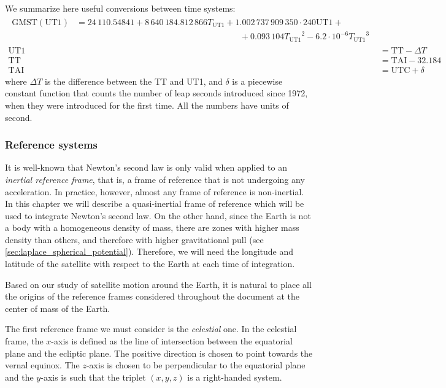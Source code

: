 \documentclass[../main.tex]{subfiles}
\begin{document}
We summarize here useful conversions between time systems:
\begin{align*}
  \begin{split}
    \mathrm{GMST}(\mathrm{UT1})&=24\,110.54841+8\,640\,184.812\,866{T_{\text{UT1}}}+1.002\,737\,909\,350\cdot240\text{UT1}+\\
    &\hspace{8cm}+0.093\,104{T_{\text{UT1}}}^2-{6.2\cdot 10^{-6}}{T_{\text{UT1}}}^3
  \end{split} \\
  \text{UT1} & =\text{TT}-\Delta T                                                                                                    \\
  \text{TT}  & =\text{TAI}-32.184                                                                                                     \\
  \text{TAI} & =\text{UTC}+\delta
\end{align*}
where $\Delta T$ is the difference between the TT and UT1, and $\delta$ is a piecewise constant function that counts the number of leap seconds introduced since 1972, when they were introduced for the first time. All the numbers have units of second.
\subsubsection{Reference systems}\label{sec:reference_systems}
It is well-known that Newton's second law is only valid when applied to an \emph{inertial reference frame}, that is, a frame of reference that is not undergoing any acceleration. In practice, however, almost any frame of reference is non-inertial. In this chapter we will describe a quasi-inertial frame of reference which will be used to integrate Newton's second law. On the other hand, since the Earth is not a body with a homogeneous density of mass, there are zones with higher mass density than others, and therefore with higher gravitational pull (see \cref{sec:laplace_spherical_potential}). Therefore, we will need the longitude and latitude of the satellite with respect to the Earth at each time of integration.

Based on our study of satellite motion around the Earth, it is natural to place all the origins of the reference frames considered throughout the document at the center of mass of the Earth.

The first reference frame we must consider is the \emph{celestial} one. In the celestial frame, the $x$-axis is defined as the line of intersection between the equatorial plane and the ecliptic plane. The positive direction is chosen to point towards the vernal equinox. The $z$-axis is chosen to be perpendicular to the equatorial plane and the $y$-axis is such that the triplet $(x,y,z)$ is a right-handed system.
\end{document}
